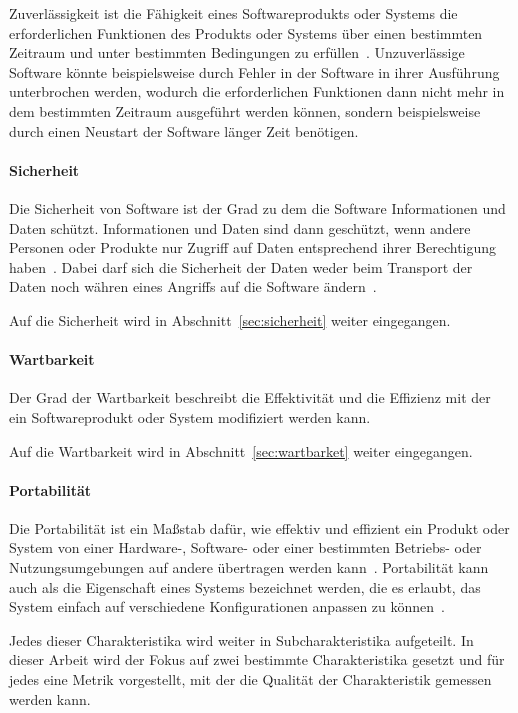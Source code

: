\documentclass[12pt, a4paper, ngerman]{article}
\begin{document}
Zuverlässigkeit ist die Fähigkeit eines Softwareprodukts oder Systems
die erforderlichen Funktionen des Produkts oder Systems über einen bestimmten Zeitraum 
und unter bestimmten Bedingungen zu erfüllen~\cite{ISO25010}.
Unzuverlässige Software könnte beispielsweise durch Fehler in der Software
in ihrer Ausführung unterbrochen werden, wodurch die erforderlichen Funktionen
dann nicht mehr in dem bestimmten Zeitraum ausgeführt werden können,
sondern beispielsweise durch einen Neustart der Software länger Zeit benötigen.

\paragraph{Sicherheit}

Die Sicherheit von Software ist der Grad zu dem die Software Informationen und Daten schützt.
Informationen und Daten sind dann geschützt,
wenn andere Personen oder Produkte nur Zugriff auf Daten 
entsprechend ihrer Berechtigung haben~\cite{ISO25010}.
Dabei darf sich die Sicherheit der Daten weder beim Transport der Daten
noch währen eines Angriffs auf die Software ändern~\cite{ISO25010}.

Auf die Sicherheit wird in Abschnitt~\ref{sec:sicherheit} weiter eingegangen.

\paragraph{Wartbarkeit}

Der Grad der Wartbarkeit beschreibt die Effektivität und die Effizienz
mit der ein Softwareprodukt oder System modifiziert werden kann.

Auf die Wartbarkeit wird in Abschnitt~\ref{sec:wartbarket} weiter eingegangen.

\paragraph{Portabilität}

Die Portabilität ist ein Maßstab dafür, 
wie effektiv und effizient ein Produkt oder System von einer Hardware-,
Software- oder einer bestimmten Betriebs- oder Nutzungsumgebungen auf andere übertragen werden kann~\cite{ISO25010}.
Portabilität kann auch als die Eigenschaft eines Systems bezeichnet werden,
die es erlaubt, das System einfach auf verschiedene Konfigurationen anpassen zu können~\cite{IEEE24765}.


Jedes dieser Charakteristika wird weiter in Subcharakteristika aufgeteilt.
In dieser Arbeit wird der Fokus auf zwei bestimmte Charakteristika gesetzt
und für jedes eine Metrik vorgestellt,
mit der die Qualität der Charakteristik gemessen werden kann.
\end{document}
